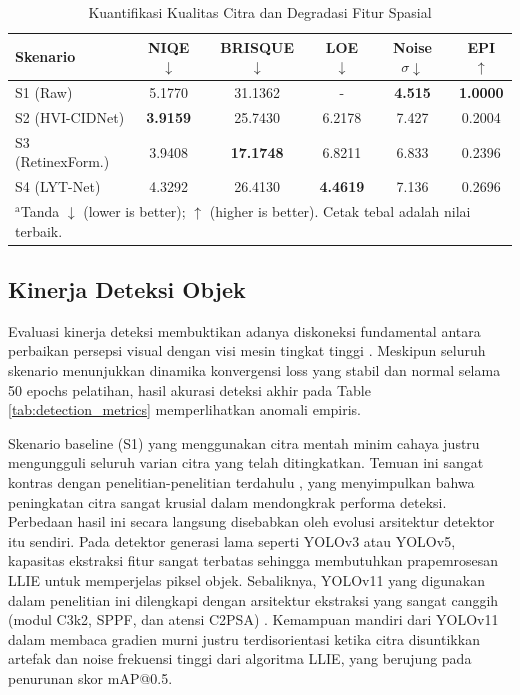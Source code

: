 \documentclass[conference]{IEEEtran}
\begin{document}
\begin{table}[htbp]
\caption{Kuantifikasi Kualitas Citra dan Degradasi Fitur Spasial}
\begin{center}
\begin{tabular}{|l|c|c|c|c|c|}
\hline
\textbf{Skenario} & \textbf{NIQE $\downarrow$} & \textbf{BRISQUE $\downarrow$} & \textbf{LOE $\downarrow$} & \textbf{Noise $\sigma \downarrow$} & \textbf{EPI $\uparrow$} \\
\hline
S1 (Raw) & 5.1770 & 31.1362 & - & \textbf{4.515} & \textbf{1.0000} \\
\hline
S2 (HVI-CIDNet) & \textbf{3.9159} & 25.7430 & 6.2178 & 7.427 & 0.2004 \\
\hline
S3 (RetinexForm.) & 3.9408 & \textbf{17.1748} & 6.8211 & 6.833 & 0.2396 \\
\hline
S4 (LYT-Net) & 4.3292 & 26.4130 & \textbf{4.4619} & 7.136 & 0.2696 \\
\hline
\multicolumn{6}{l}{$^{\mathrm{a}}$Tanda $\downarrow$ (lower is better); $\uparrow$ (higher is better). Cetak tebal adalah nilai terbaik.}
\end{tabular}
\label{tab:image_quality}
\end{center}
\end{table}

\subsection{Kinerja Deteksi Objek}
Evaluasi kinerja deteksi membuktikan adanya diskoneksi fundamental antara perbaikan persepsi visual dengan visi mesin tingkat tinggi \cite{wu2024llieeffect}. Meskipun seluruh skenario menunjukkan dinamika konvergensi loss yang stabil dan normal selama 50 epochs pelatihan, hasil akurasi deteksi akhir pada Table \ref{tab:detection_metrics} memperlihatkan anomali empiris.

Skenario baseline (S1) yang menggunakan citra mentah minim cahaya justru mengungguli seluruh varian citra yang telah ditingkatkan. Temuan ini sangat kontras dengan penelitian-penelitian terdahulu \cite{wang2023yolov5lowlight}, \cite{shovo2024lowlight} yang menyimpulkan bahwa peningkatan citra sangat krusial dalam mendongkrak performa deteksi. Perbedaan hasil ini secara langsung disebabkan oleh evolusi arsitektur detektor itu sendiri. Pada detektor generasi lama seperti YOLOv3 atau YOLOv5, kapasitas ekstraksi fitur sangat terbatas sehingga membutuhkan prapemrosesan LLIE untuk memperjelas piksel objek. Sebaliknya, YOLOv11 yang digunakan dalam penelitian ini dilengkapi dengan arsitektur ekstraksi yang sangat canggih (modul C3k2, SPPF, dan atensi C2PSA) \cite{khanam2024yolov11}. Kemampuan mandiri dari YOLOv11 dalam membaca gradien murni justru terdisorientasi ketika citra disuntikkan artefak dan noise frekuensi tinggi dari algoritma LLIE, yang berujung pada penurunan skor mAP@0.5. 
\end{document}
